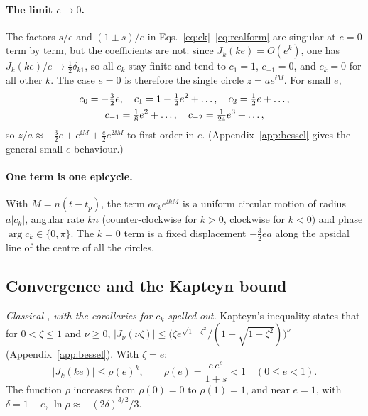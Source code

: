\paragraph*{The limit $e\to0$.}
The factors $s/e$ and $(1\pm s)/e$ in Eqs.~\eqref{eq:ck}--\eqref{eq:realform}
are singular at $e=0$ term by term, but the coefficients are not: since
$J_k(ke)=O(e^k)$, one has $J_k(ke)/e\to\tfrac12\delta_{k1}$, so all
$c_k$ stay finite and tend to $c_1=1$, $c_{-1}=0$, and $c_k=0$ for all other
$k$. The case $e=0$ is therefore the single circle $z=ae^{\ii M}$. For small
$e$,
\begin{gather}
c_0=-\tfrac32e,\quad c_1=1-\tfrac12e^2+\dots,\quad c_2=\tfrac12e+\dots,\notag\\
c_{-1}=\tfrac18e^2+\dots,\quad c_{-2}=\tfrac1{24}e^3+\dots,
\label{eq:smalle}
\end{gather}
so $z/a\approx-\tfrac32e+e^{\ii M}+\tfrac e2e^{2\ii M}$ to first order in $e$.
(Appendix~\ref{app:bessel} gives the general small-$e$ behaviour.)

\paragraph*{One term is one epicycle.}
With $M=n(t-t_p)$, the term $ac_ke^{\ii kM}$ is a uniform circular motion of
radius $a|c_k|$, angular rate $kn$ (counter-clockwise for $k>0$, clockwise
for $k<0$) and phase $\arg c_k\in\{0,\pi\}$. The $k=0$ term is a fixed
displacement $-\tfrac32ea$ along the apsidal line of the centre of all the
circles.

\subsection{Convergence and the Kapteyn bound}
\label{sec:th-conv}

\emph{Classical \cite{Kapteyn1893,Watson1944}, with the corollaries for
$c_k$ spelled out.} Kapteyn's inequality states that for $0<\zeta\le1$ and
$\nu\ge0$, $|J_\nu(\nu\zeta)|\le\big(\zeta e^{\sqrt{1-\zeta^2}}/(1+\sqrt{1-\zeta^2})\big)^\nu$
(Appendix~\ref{app:bessel}). With $\zeta=e$:
\begin{equation}
|J_k(ke)|\le\rho(e)^k,\qquad
\rho(e)=\frac{e\,e^{s}}{1+s}<1\quad(0\le e<1).
\label{eq:kapteyn}
\end{equation}
The function $\rho$ increases from $\rho(0)=0$ to $\rho(1)=1$, and near
$e=1$, with $\delta=1-e$, $\ln\rho\approx-(2\delta)^{3/2}/3$.

